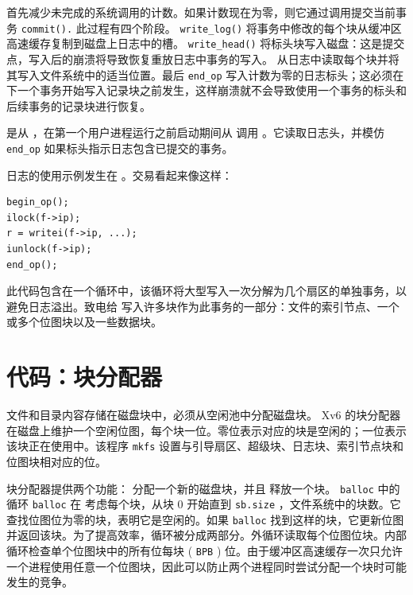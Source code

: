         首先减少未完成的系统调用的计数。如果计数现在为零，则它通过调用提交当前事务
    \lstinline{commit().}    此过程有四个阶段。
    \lstinline{write_log()}   
        将事务中修改的每个块从缓冲区高速缓存复制到磁盘上日志中的槽。
    \lstinline{write_head()}   
        将标头块写入磁盘：这是提交点，写入后的崩溃将导致恢复重放日志中事务的写入。
        从日志中读取每个块并将其写入文件系统中的适当位置。最后
    \lstinline{end_op}    写入计数为零的日志标头；这必须在下一个事务开始写入记录块之前发生，这样崩溃就不会导致使用一个事务的标头和后续事务的记录块进行恢复。  

        是从
        ，在第一个用户进程运行之前启动期间从               调用
        。它读取日志头，并模仿
    \lstinline{end_op}    如果标头指示日志包含已提交的事务。  

日志的使用示例发生在
        。交易看起来像这样：
\begin{lstlisting}[]
begin_op();
ilock(f->ip);
r = writei(f->ip, ...);
iunlock(f->ip);
end_op();
\end{lstlisting}    此代码包含在一个循环中，该循环将大型写入一次分解为几个扇区的单独事务，以避免日志溢出。致电给
        写入许多块作为此事务的一部分：文件的索引节点、一个或多个位图块以及一些数据块。
    \section{代码：块分配器  }     

文件和目录内容存储在磁盘块中，必须从空闲池中分配磁盘块。 Xv6 的块分配器在磁盘上维护一个空闲位图，每个块一位。零位表示对应的块是空闲的；一位表示该块正在使用中。该程序
    \lstinline{mkfs}    设置与引导扇区、超级块、日志块、索引节点块和位图块相对应的位。  

块分配器提供两个功能：
        分配一个新的磁盘块，并且
        释放一个块。
    \lstinline{balloc}    中的循环
    \lstinline{balloc}    在
        考虑每个块，从块 0 开始直到
    \lstinline{sb.size}    ，文件系统中的块数。它查找位图位为零的块，表明它是空闲的。如果
    \lstinline{balloc}    找到这样的块，它更新位图并返回该块。为了提高效率，循环被分成两部分。外循环读取每个位图位块。内部循环检查单个位图块中的所有位每块 (    \lstinline{BPB}    ) 位。由于缓冲区高速缓存一次只允许一个进程使用任意一个位图块，因此可以防止两个进程同时尝试分配一个块时可能发生的竞争。  

